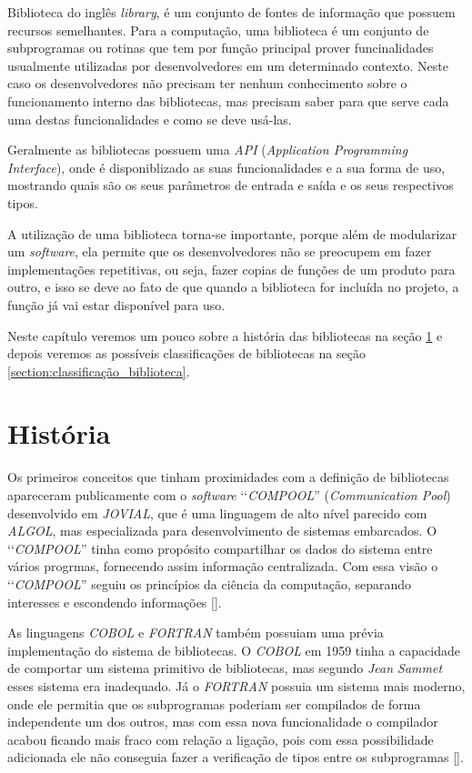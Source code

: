 Biblioteca do inglês \emph{library}, é um conjunto de fontes de informação que possuem recursos 
semelhantes. Para a computação, uma biblioteca é um conjunto de subprogramas ou 
rotinas que tem por função principal prover funcinalidades usualmente utilizadas por 
desenvolvedores em um determinado contexto. Neste caso os desenvolvedores não precisam ter 
nenhum conhecimento sobre o funcionamento interno das bibliotecas, mas precisam saber para que 
serve cada uma destas funcionalidades e como se deve usá-las. 

Geralmente as bibliotecas possuem uma \emph{API} (\emph{Application Programming Interface}), onde 
é disponiblizado as suas funcionalidades e a sua forma de uso, mostrando quais são os seus 
parâmetros de entrada e saída e os seus respectivos tipos.

A utilização de uma biblioteca torna-se importante, porque além de modularizar um \emph{software}, ela
permite que os desenvolvedores não se preocupem em fazer implementações repetitivas, ou seja, fazer 
copias de funções de um produto para outro, e isso se deve ao fato de que quando a biblioteca for 
incluída no projeto, a função já vai estar disponível para uso.

Neste capítulo veremos um pouco sobre a história das bibliotecas na seção 
\ref{section:historia_biblioteca} e depois veremos as possíveis classificações de bibliotecas na seção 
\ref{section:classificação_biblioteca}.

\section{História}
\label{section:historia_biblioteca}

Os primeiros conceitos que tinham proximidades com a definição de bibliotecas apareceram publicamente 
com o \emph{software} ‘‘\emph{COMPOOL}'' (\emph{Communication Pool}) desenvolvido em \emph{JOVIAL}, 
que é uma linguagem de alto nível parecido com \emph{ALGOL}, mas especializada para desenvolvimento 
de sistemas embarcados. O ‘‘\emph{COMPOOL}'' tinha como propósito compartilhar os dados do 
sistema entre vários progrmas, fornecendo assim informação centralizada. Com essa visão o 
‘‘\emph{COMPOOL}'' seguiu os princípios da ciência da computação, separando interesses e 
escondendo informações [].

As linguagens \emph{COBOL} e \emph{FORTRAN} também possuiam uma prévia implementação do sistema de
bibliotecas. O \emph{COBOL} em 1959 tinha a capacidade de comportar um sistema primitivo de 
bibliotecas, mas segundo \emph{Jean Sammet} esses sistema era inadequado. Já o 
\emph{FORTRAN} possuia um sistema mais moderno, onde ele permitia que os subprogramas poderiam ser 
compilados de forma independente um dos outros, mas com essa nova funcionalidade o compilador acabou 
ficando mais fraco com relação a ligação, pois com essa possibilidade adicionada ele não conseguia 
fazer a verificação de tipos entre os subprogramas [].

